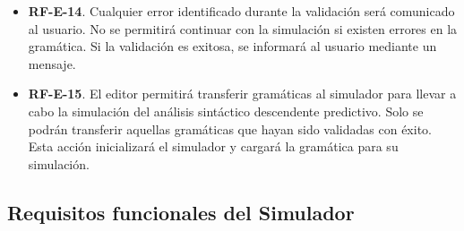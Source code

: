 \begin{itemize}
\item \textbf{RF-E-14}. Cualquier error identificado durante la validación será comunicado al usuario. No se permitirá continuar con la simulación si existen errores en la gramática. Si la validación es exitosa, se informará al usuario mediante un mensaje.

\item \textbf{RF-E-15}. El editor permitirá transferir gramáticas al simulador para llevar a cabo la simulación del análisis sintáctico descendente predictivo. Solo se podrán transferir aquellas gramáticas que hayan sido validadas con éxito. Esta acción inicializará el simulador y cargará la gramática para su simulación.

\end{itemize}

\subsection{Requisitos funcionales del Simulador}

